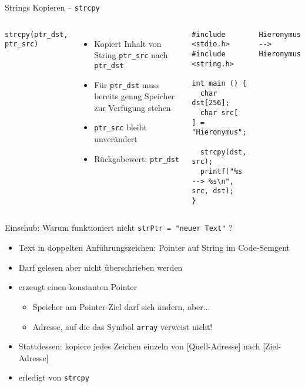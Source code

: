 \begin{frame}[fragile]{Strings Kopieren -- \texttt{strcpy}}
%
\begin{columns}[T]
\begin{codebox}[Syntax]
\footnotesize\texttt{strcpy(ptr\_dst, ptr\_src)}
\end{codebox}
%
\begin{itemize}
\item Kopiert Inhalt von String \texttt{ptr\_src} nach \texttt{ptr\_dst}
\item Für \texttt{ptr\_dst} muss bereits genug Speicher zur Verfügung stehen
\item \texttt{ptr\_src} bleibt unverändert
\item Rückgabewert: \texttt{ptr\_dst}
\end{itemize}
%
\begin{codebox}[Beispiel]
\begin{verbatim}
#include <stdio.h>
#include <string.h>

int main () {
  char dst[256];
  char src[   ] = "Hieronymus";

  strcpy(dst, src);
  printf("%s --> %s\n", src, dst);
}
\end{verbatim}
\end{codebox}
%
\begin{cmdbox}[Ausgabe]
\scriptsize\texttt{Hieronymus -{}-> Hieronymus}
\end{cmdbox}
%
\end{columns}
%
\end{frame}


\begin{frame}{Einschub: Warum funktioniert nicht \texttt{strPtr = "neuer Text"} ?}
%
\begin{itemize}
\item Text in doppelten Anführungszeichen: Pointer auf String im Code-Semgent
\item Darf gelesen aber nicht überschrieben werden
\item {} erzeugt einen konstanten Pointer
	\begin{itemize}
	\item Speicher am Pointer-Ziel darf sich ändern, aber...
	\item Adresse, auf die das Symbol \texttt{array} verweist nicht!
	\end{itemize}
\item Stattdessen: kopiere jedes Zeichen einzeln von [Quell-Adresse] nach [Ziel-Adresse]
\item[\Thus] erledigt von \texttt{strcpy}
\end{itemize}
%
\end{frame}

